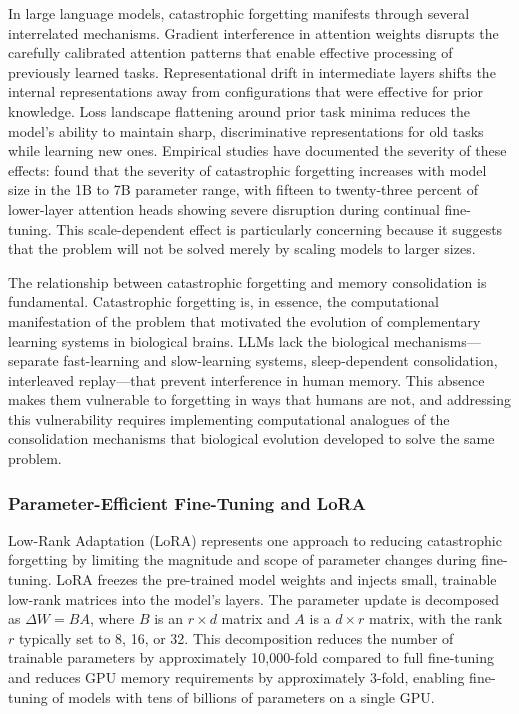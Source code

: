 In large language models, catastrophic forgetting manifests through several interrelated mechanisms. Gradient interference in attention weights disrupts the carefully calibrated attention patterns that enable effective processing of previously learned tasks. Representational drift in intermediate layers shifts the internal representations away from configurations that were effective for prior knowledge. Loss landscape flattening around prior task minima reduces the model's ability to maintain sharp, discriminative representations for old tasks while learning new ones. Empirical studies have documented the severity of these effects: \citet{luo2023empirical} found that the severity of catastrophic forgetting increases with model size in the 1B to 7B parameter range, with fifteen to twenty-three percent of lower-layer attention heads showing severe disruption during continual fine-tuning. This scale-dependent effect is particularly concerning because it suggests that the problem will not be solved merely by scaling models to larger sizes.

The relationship between catastrophic forgetting and memory consolidation is fundamental. Catastrophic forgetting is, in essence, the computational manifestation of the problem that motivated the evolution of complementary learning systems in biological brains. LLMs lack the biological mechanisms---separate fast-learning and slow-learning systems, sleep-dependent consolidation, interleaved replay---that prevent interference in human memory. This absence makes them vulnerable to forgetting in ways that humans are not, and addressing this vulnerability requires implementing computational analogues of the consolidation mechanisms that biological evolution developed to solve the same problem.

\subsubsection{Parameter-Efficient Fine-Tuning and LoRA}

Low-Rank Adaptation (LoRA) \citep{hu2022lora} represents one approach to reducing catastrophic forgetting by limiting the magnitude and scope of parameter changes during fine-tuning. LoRA freezes the pre-trained model weights and injects small, trainable low-rank matrices into the model's layers. The parameter update is decomposed as $\Delta W = BA$, where $B$ is an $r \times d$ matrix and $A$ is a $d \times r$ matrix, with the rank $r$ typically set to 8, 16, or 32. This decomposition reduces the number of trainable parameters by approximately 10,000-fold compared to full fine-tuning and reduces GPU memory requirements by approximately 3-fold, enabling fine-tuning of models with tens of billions of parameters on a single GPU.

